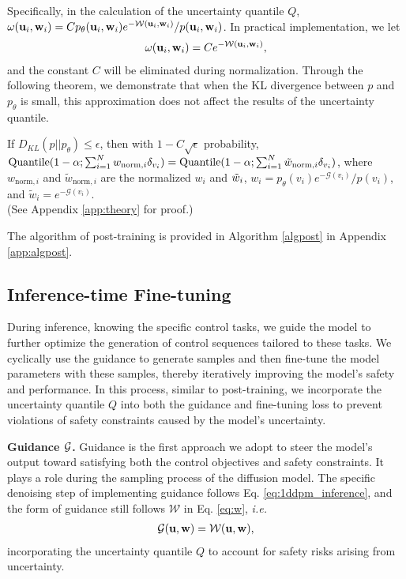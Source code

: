 Specifically, in the calculation of the uncertainty quantile $Q$, $\omega(\mathbf{u}_i,\mathbf{w}_i)=Cp_\theta(\mathbf{u}_i,\mathbf{w}_i)e^{-\mathcal{W}(\mathbf{u}_i,\mathbf{w}_i)}/p(\mathbf{u}_i,\mathbf{w}_i)$. In practical implementation, we let 
\begin{align}
    \omega(\mathbf{u}_i,\mathbf{w}_i)=Ce^{-\mathcal{W}(\mathbf{u}_i,\mathbf{w}_i)},
\end{align}
and the constant $C$ will be eliminated during normalization. Through the following theorem, we demonstrate that when the KL divergence between $p$ and $p_\theta$ is small, this approximation does not affect the results of the uncertainty quantile.
\begin{theorem}
    If $D_{KL}(p||p_\theta)\leq\epsilon$, then with $1-C\sqrt{\epsilon}$ probability, $\textrm{Quantile}(1-\alpha;\sum_{i=1}^N w_{\textrm{\textrm{norm}},i}\delta_{v_i})=\textrm{Quantile}(1-\alpha;\sum_{i=1}^N \tilde{w}_{\textrm{norm},i}\delta_{v_i})$, where $w_{\textrm{norm},i}$ and $\tilde{w}_{\textrm{norm},i}$ are the normalized $w_i$ and $\Tilde{w}_i$, $w_i=p_\theta(v_i) e^{-\mathcal{G}(v_i)}/p(v_i)$, and $\tilde{w}_i=e^{-\mathcal{G}(v_i)}$.\\
    (See Appendix \ref{app:theory} for proof.)
\end{theorem}

The algorithm of post-training is provided in Algorithm \ref{algpost} in Appendix \ref{app:algpost}.

\subsection{Inference-time Fine-tuning}
\label{sec:finetune}

During inference, knowing the specific control tasks, we guide the model to further optimize the generation of control sequences tailored to these tasks. We cyclically use the guidance to generate samples and then fine-tune the model parameters with these samples, thereby iteratively improving the model's safety and performance. In this process, similar to post-training, we incorporate the uncertainty quantile $Q$ into both the guidance and fine-tuning loss to prevent violations of safety constraints caused by the model’s uncertainty.

\textbf{Guidance $\mathcal{G}$.} Guidance is the first approach we adopt to steer the model’s output toward satisfying both the control objectives and safety constraints. It plays a role during the sampling process of the diffusion model. The specific denoising step of implementing guidance follows Eq. \ref{eq:1ddpm_inference}, and the form of guidance still follows $\mathcal{W}$ in Eq. \ref{eq:w}, \emph{i.e.} 
\begin{align}
    \mathcal{G}(\mathbf{u},\mathbf{w}) = \mathcal{W}(\mathbf{u},\mathbf{w}),
    \label{eq:guidance}
\end{align}
incorporating the uncertainty quantile $Q$ to account for safety risks arising from uncertainty.


